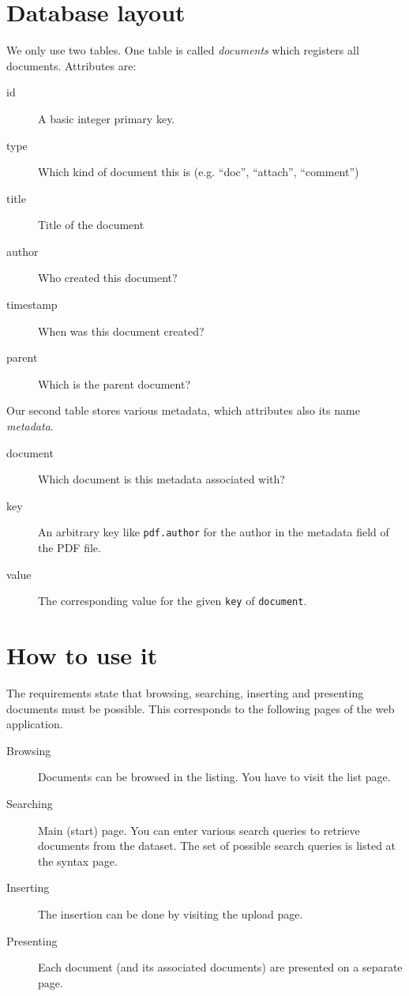 \documentclass{article}
\begin{document}
\section{Database layout}
%
We only use two tables. One table is called \emph{documents} which registers all documents. Attributes are:
\begin{description}
  \item[id] A basic integer primary key.
  \item[type] Which kind of document this is (e.g. ``doc'', ``attach'', ``comment'')
  \item[title] Title of the document
  \item[author] Who created this document?
  \item[timestamp] When was this document created?
  \item[parent] Which is the parent document?
\end{description}

Our second table stores various metadata, which attributes also its name \emph{metadata}.
\begin{description}
  \item[document] Which document is this metadata associated with?
  \item[key] An arbitrary key like \texttt{pdf.author} for the author in the metadata field of the PDF file.
  \item[value] The corresponding value for the given \texttt{key} of \texttt{document}.
\end{description}

\section{How to use it}
%
The requirements state that browsing, searching, inserting and presenting documents must be possible.
This corresponds to the following pages of the web application.
\begin{description}
  \item[Browsing]
    Documents can be browsed in the listing. You have to visit the list page.
  \item[Searching]
    Main (start) page. You can enter various search queries to retrieve documents from the dataset.
    The set of possible search queries is listed at the syntax page.
  \item[Inserting]
    The insertion can be done by visiting the upload page.
  \item[Presenting]
    Each document (and its associated documents) are presented on a separate page.
\end{description}
\end{document}
